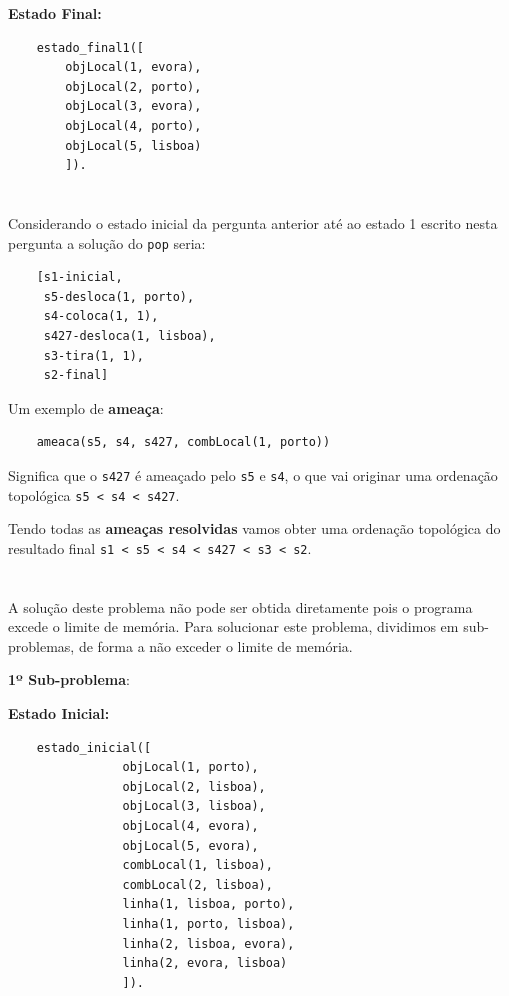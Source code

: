 \documentclass[11pt]{article}
\begin{document}
\newpage
\textbf{Estado Final:}

\begin{lstlisting}
    estado_final1([
        objLocal(1, evora),
        objLocal(2, porto),
        objLocal(3, evora),
        objLocal(4, porto),
        objLocal(5, lisboa)
        ]).
\end{lstlisting}

\section{}

\hspace{0,6cm}Considerando o estado inicial da pergunta anterior até ao estado 1 escrito nesta pergunta
a solução do \verb|pop| seria:

\begin{lstlisting}
    [s1-inicial,
     s5-desloca(1, porto),
     s4-coloca(1, 1),
     s427-desloca(1, lisboa),
     s3-tira(1, 1),
     s2-final]
\end{lstlisting}

Um exemplo de \textbf{ameaça}:

\begin{lstlisting}
    ameaca(s5, s4, s427, combLocal(1, porto))
\end{lstlisting}

Significa que o \verb|s427| é ameaçado pelo \verb|s5| e \verb|s4|, o que vai originar uma
ordenação topológica \verb|s5 < s4 < s427|.

Tendo todas as \textbf{ameaças resolvidas} vamos obter uma ordenação topológica do resultado
final \verb|s1 < s5 < s4 < s427 < s3 < s2|.

\section{}

\hspace{0,6cm}A solução deste problema não pode ser obtida diretamente pois o programa excede
o limite de memória. Para solucionar este problema, dividimos em sub-problemas, de forma a não
exceder o limite de memória.

\textbf{1º Sub-problema}:

\hspace{1,2cm}\textbf{Estado Inicial:}

\begin{lstlisting}
    estado_inicial([
                objLocal(1, porto),
                objLocal(2, lisboa),
                objLocal(3, lisboa),
                objLocal(4, evora),
                objLocal(5, evora),
                combLocal(1, lisboa),
                combLocal(2, lisboa),
                linha(1, lisboa, porto),
                linha(1, porto, lisboa),
                linha(2, lisboa, evora),
                linha(2, evora, lisboa)
                ]).
\end{lstlisting}
\end{document}
